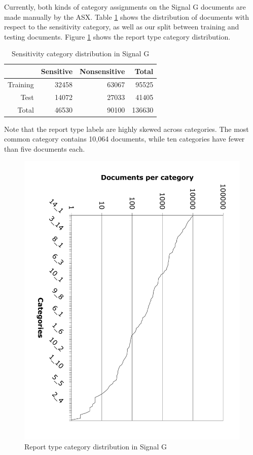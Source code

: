 \documentclass[twocolumn]{article}
\begin{document}
Currently, both kinds of category assignments on the Signal G
documents are made manually by the ASX.  Table
\ref{signalg-sensitivity} shows the distribution of documents with
respect to the sensitivity category, as well as our split between
training and testing documents.  Figure \ref{signalg-reptype} shows
the report type category distribution.


\begin{table}
\begin{tabular}{|r|r|r|r|}
\hline
         & Sensitive & Nonsensitive & Total \\
\hline
Training & 32458     & 63067        & 95525 \\
\hline
Test     & 14072     & 27033        & 41405 \\
\hline
Total    & 46530     & 90100        & 136630\\
\hline
\end{tabular}
\caption{Sensitivity category distribution in Signal G}
\label{signalg-sensitivity}
\end{table}

Note that the report type labels are highly skewed across categories.  The most
common category contains 10,064 documents, while ten categories have
fewer than five documents each.

\begin{figure}
\includegraphics[angle=90,width=\linewidth]{signalg-reptype}
\caption{Report type category distribution in Signal G}
\label{signalg-reptype}
\end{figure}
\end{document}
